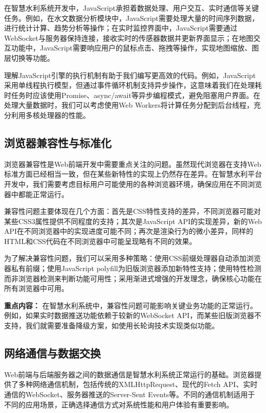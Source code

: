 在智慧水利系统开发中，JavaScript承担着数据处理、用户交互、实时通信等关键任务。例如，在水文数据分析模块中，JavaScript需要处理大量的时间序列数据，进行统计计算、趋势分析等操作；在实时监控界面中，JavaScript需要通过WebSocket与服务器保持连接，接收实时的传感器数据并更新界面显示；在地图交互功能中，JavaScript需要响应用户的鼠标点击、拖拽等操作，实现地图缩放、图层切换等功能。

理解JavaScript引擎的执行机制有助于我们编写更高效的代码。例如，JavaScript采用单线程执行模型，但通过事件循环机制支持异步操作，这意味着我们在处理耗时任务时应该使用Promise、async/await等异步编程模式，避免阻塞用户界面。在处理大量数据时，我们可以考虑使用Web Workers将计算任务分配到后台线程，充分利用多核处理器的性能。

\subsection{浏览器兼容性与标准化}\label{ux6d4fux89c8ux5668ux517cux5bb9ux6027ux4e0eux6807ux51c6ux5316}

浏览器兼容性是Web前端开发中需要重点关注的问题。虽然现代浏览器在支持Web标准方面已经相当一致，但在某些新特性的实现上仍然存在差异。在智慧水利平台开发中，我们需要考虑目标用户可能使用的各种浏览器环境，确保应用在不同浏览器中都能正常运行。

兼容性问题主要体现在几个方面：首先是CSS特性支持的差异，不同浏览器可能对某些CSS3属性提供不同程度的支持；其次是JavaScript API的实现差异，新的Web API在不同浏览器中的实现进度可能不同；再次是渲染行为的微小差异，同样的HTML和CSS代码在不同浏览器中可能呈现略有不同的效果。

为了解决兼容性问题，我们可以采用多种策略：使用CSS前缀处理器自动添加浏览器私有前缀；使用JavaScript polyfill为旧版浏览器添加新特性支持；使用特性检测而非浏览器检测来判断功能可用性；采用渐进式增强的开发理念，确保核心功能在所有浏览器中可用。

\textbf{重点内容：} 在智慧水利系统中，兼容性问题可能影响关键业务功能的正常运行。例如，如果实时数据推送功能依赖于较新的WebSocket API，而某些旧版浏览器不支持，我们就需要准备降级方案，如使用长轮询技术实现类似功能。

\subsection{网络通信与数据交换}\label{ux7f51ux7edcux901aux4fe1ux4e0eux6570ux636eux4ea4ux6362}

Web前端与后端服务器之间的数据通信是智慧水利系统正常运行的基础。浏览器提供了多种网络通信机制，包括传统的XMLHttpRequest、现代的Fetch API、实时通信的WebSocket、服务器推送的Server-Sent Events等。不同的通信机制适用于不同的应用场景，正确选择通信方式对系统性能和用户体验有重要影响。

